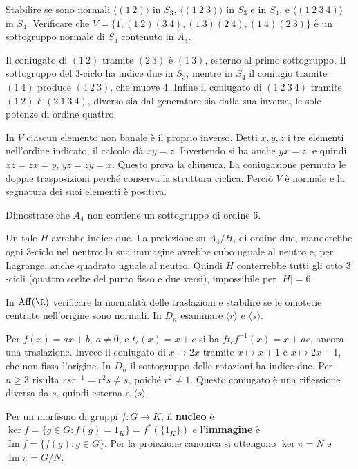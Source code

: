 \begin{esercizio}
Stabilire se sono normali $\langle(1\ 2)\rangle$ in $S_3$, $\langle(1\ 2\ 3)\rangle$ in $S_3$ e in $S_4$, e $\langle(1\ 2\ 3\ 4)\rangle$ in $S_4$. Verificare che $V=\{1,(1\ 2)(3\ 4),(1\ 3)(2\ 4),(1\ 4)(2\ 3)\}$ è un sottogruppo normale di $S_4$ contenuto in $A_4$.
\end{esercizio}
\begin{svolgimento}
Il coniugato di $(1\ 2)$ tramite $(2\ 3)$ è $(1\ 3)$, esterno al primo sottogruppo. Il sottogruppo del $3$-ciclo ha indice due in $S_3$, mentre in $S_4$ il coniugio tramite $(1\ 4)$ produce $(4\ 2\ 3)$, che muove $4$. Infine il coniugato di $(1\ 2\ 3\ 4)$ tramite $(1\ 2)$ è $(2\ 1\ 3\ 4)$, diverso sia dal generatore sia dalla sua inversa, le sole potenze di ordine quattro.

In $V$ ciascun elemento non banale è il proprio inverso. Detti $x,y,z$ i tre elementi nell'ordine indicato, il calcolo dà $xy=z$. Invertendo si ha anche $yx=z$, e quindi $xz=zx=y$, $yz=zy=x$. Questo prova la chiusura. La coniugazione permuta le doppie trasposizioni perché conserva la struttura ciclica. Perciò $V$ è normale e la segnatura dei suoi elementi è positiva.
\end{svolgimento}
\begin{esercizio}
Dimostrare che $A_4$ non contiene un sottogruppo di ordine $6$.
\end{esercizio}
\begin{svolgimento}
Un tale $H$ avrebbe indice due. La proiezione su $A_4/H$, di ordine due, manderebbe ogni $3$-ciclo nel neutro: la sua immagine avrebbe cubo uguale al neutro e, per Lagrange, anche quadrato uguale al neutro. Quindi $H$ conterrebbe tutti gli otto $3$-cicli (quattro scelte del punto fisso e due versi), impossibile per $|H|=6$.
\end{svolgimento}

\begin{esercizio}
In $\operatorname{Aff}(\R)$ verificare la normalità delle traslazioni e stabilire se le omotetie centrate nell'origine sono normali. In $D_n$ esaminare $\langle r\rangle$ e $\langle s\rangle$.
\end{esercizio}
\begin{svolgimento}
Per $f(x)=ax+b$, $a\ne0$, e $t_c(x)=x+c$ si ha $ft_cf^{-1}(x)=x+ac$, ancora una traslazione. Invece il coniugato di $x\mapsto2x$ tramite $x\mapsto x+1$ è $x\mapsto2x-1$, che non fissa l'origine. In $D_n$ il sottogruppo delle rotazioni ha indice due. Per $n\ge3$ risulta $rsr^{-1}=r^2s\ne s$, poiché $r^2\ne1$. Questo coniugato è una riflessione diversa da $s$, quindi esterna a $\langle s\rangle$.
\end{svolgimento}
\begin{definizione}
Per un morfismo di gruppi $f:G\to K$, il \textbf{nucleo} è $\ker f=\{g\in G:f(g)=1_K\}=f^*(\{1_K\})$ e l'\textbf{immagine} è $\operatorname{Im}f=\{f(g):g\in G\}$. Per la proiezione canonica si ottengono $\ker\pi=N$ e $\operatorname{Im}\pi=G/N$.
\end{definizione}
